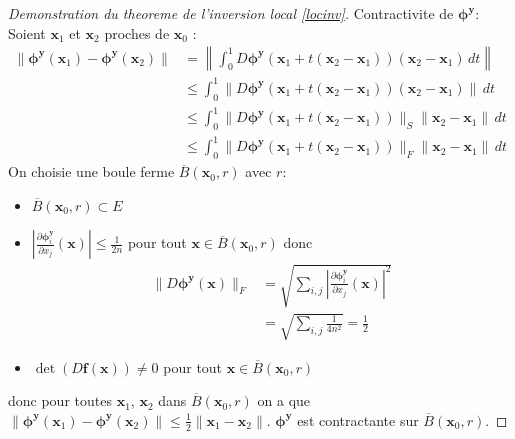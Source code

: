 \begin{proof}[Demonstration du theoreme de l'inversion local \ref{locinv}]
Contractivite de $\boldsymbol{\phi}^{\boldsymbol{y}}$: Soient $\boldsymbol{x}_{1}$ et $\boldsymbol{x}_{2}$ proches de $\boldsymbol{x}_{0}$ :
\begin{align*}
\lVert \boldsymbol{\phi}^{\boldsymbol{y}}(\boldsymbol{x}_{1})-\boldsymbol{\phi}^{\boldsymbol{y}}(\boldsymbol{x}_{2}) \rVert  & =\left\lVert  \int_{0}^{1} D\boldsymbol{\phi}^{\boldsymbol{y}}(\boldsymbol{x}_{1}+t(\boldsymbol{x}_{2}-\boldsymbol{x}_{1}))(\boldsymbol{x}_{2}-\boldsymbol{x}_{1}) \, dt   \right\rVert  \\
 & \le \int_{0}^{1} \lVert D\boldsymbol{\phi}^{\boldsymbol{y}}(\boldsymbol{x}_{1}+t(\boldsymbol{x}_{2}-\boldsymbol{x}_{1})) (\boldsymbol{x}_{2}-\boldsymbol{x}_{1}) \rVert  \, dt \\
 & \le \int_{0}^{1} \lVert D\boldsymbol{\phi}^{\boldsymbol{y}}(\boldsymbol{x}_{1}+t(\boldsymbol{x}_{2}-\boldsymbol{x}_{1})) \rVert_{S}  \lVert \boldsymbol{x}_{2}-\boldsymbol{x}_{1} \rVert \, dt   \\
 & \le \int_{0}^{1} \lVert D\boldsymbol{\phi}^{\boldsymbol{y}}(\boldsymbol{x}_{1}+t(\boldsymbol{x}_{2}-\boldsymbol{x}_{1})) \rVert_{F} \lVert \boldsymbol{x}_{2}-\boldsymbol{x}_{1} \rVert   \, dt 
\end{align*}
On choisie une boule ferme $\overline{B}(\boldsymbol{x}_{0},r)$ avec $r$:
\begin{itemize}
\item $\overline{B}(\boldsymbol{x}_{0},r)\subset E$
\item $\left\lvert  \frac{ \partial \boldsymbol{\phi}^{\boldsymbol{y}}_{i} }{ \partial x_{j} }(\boldsymbol{x})  \right\rvert \le \frac{1}{2n}$ pour tout $\boldsymbol{x}\in \overline{B}(\boldsymbol{x}_{0},r)$ donc 
\begin{align*}
\lVert D\boldsymbol{\phi}^{\boldsymbol{y}}(\boldsymbol{x}) \rVert_{F} & =\sqrt{ \sum _{i,j} \left\lvert  \frac{ \partial \boldsymbol{\phi}^{\boldsymbol{y}}_{i} }{ \partial x_{j}} (\boldsymbol{x})  \right\rvert^{2}  } \\
 & =\sqrt{ \sum _{i,j} \frac{1}{4n^{2}}  }=\frac{1}{2}
\end{align*}
\item $\det(D\boldsymbol{f}(\boldsymbol{x}))\neq 0$ pour tout $\boldsymbol{x}\in \overline{B}(\boldsymbol{x}_{0},r)$
\end{itemize}
donc pour toutes $\boldsymbol{x}_{1}$, $\boldsymbol{x}_{2}$ dans $\overline{B}(\boldsymbol{x}_{0},r)$ on a que $\lVert \boldsymbol{\phi}^{\boldsymbol{y}}(\boldsymbol{x}_{1})-\boldsymbol{\phi}^{\boldsymbol{y}}(\boldsymbol{x}_{2}) \rVert\le \frac{1}{2}\lVert \boldsymbol{x}_{1} -\boldsymbol{x}_{2}\rVert$. $\boldsymbol{\phi}^{\boldsymbol{y}}$ est contractante sur $\overline{B}(\boldsymbol{x}_{0},r)$.


\end{proof}

